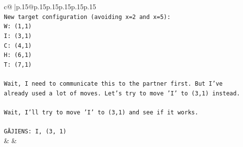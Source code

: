 \documentclass{article}
\begin{document}
{\begin{supertabular}{c@{$\;$}|p{.15\linewidth}@{}p{.15\linewidth}p{.15\linewidth}p{.15\linewidth}p{.15\linewidth}p{.15\linewidth}}
{{{\\ 
\texttt{New target configuration (avoiding x=2 and x=5):} \\
\texttt{W: (1,1)} \\
\texttt{I: (3,1)} \\
\texttt{C: (4,1)} \\
\texttt{H: (6,1)} \\
\texttt{T: (7,1)} \\
\\ 
\texttt{Wait, I need to communicate this to the partner first. But I've already used a lot of moves. Let's try to move 'I' to (3,1) instead.} \\
\\ 
\texttt{Wait, I'll try to move 'I' to (3,1) and see if it works.} \\
\\ 
\texttt{GĀJIENS: I, (3, 1)} \\
            }
        }
    }
    & & \\ \\


\end{supertabular}}
\end{document}

